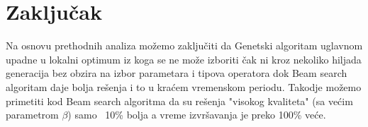 \documentclass{article}
\begin{document}
    \section{Zaključak}

    Na osnovu prethodnih analiza možemo zaključiti da Genetski algoritam uglavnom upadne u lokalni optimum iz koga se ne može izboriti čak ni kroz nekoliko hiljada generacija bez obzira na izbor parametara i tipova operatora dok Beam search algoritam daje bolja rešenja i to u kraćem vremenskom periodu. Takodje možemo primetiti kod Beam search algoritma da su rešenja "visokog kvaliteta" (sa većim parametrom $\beta$) samo ~10\% bolja a vreme izvršavanja je preko 100\% veće.

    \pagebreak

    \printbibliography[heading=bibintoc,title={Literatura}]
\end{document}
